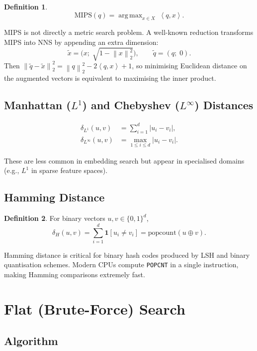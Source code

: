 \documentclass[11pt,a4paper]{article}
\theoremstyle{definition}
\newtheorem{definition}{Definition}[section]
\newcommand{\norm}[1]{\left\lVert #1 \right\rVert}
\newcommand{\inner}[2]{\left\langle #1, #2 \right\rangle}
\newcommand{\argmax}{\operatorname{arg\,max}}
\begin{document}
\begin{definition}
\[
  \mathrm{MIPS}(q) = \argmax_{x \in X}\; \inner{q}{x}.
\]
\end{definition}

MIPS is not directly a metric search problem.  A well-known reduction
transforms MIPS into NNS by appending an extra dimension:
\[
  \tilde{x} = \bigl(x;\; \sqrt{1 - \norm{x}^2_2}\bigr), \qquad
  \tilde{q} = (q;\; 0).
\]
Then $\norm{\tilde{q} - \tilde{x}}^2_2 = \norm{q}^2_2 - 2\inner{q}{x}
+ 1$, so minimising Euclidean distance on the augmented vectors is
equivalent to maximising the inner product.

\subsection{Manhattan ($L^1$) and Chebyshev ($L^\infty$) Distances}

\begin{align}
  \delta_{L^1}(u,v) &= \sum_{i=1}^d |u_i - v_i|, \\
  \delta_{L^\infty}(u,v) &= \max_{1\le i\le d} |u_i - v_i|.
\end{align}

These are less common in embedding search but appear in specialised
domains (e.g., $L^1$ in sparse feature spaces).

\subsection{Hamming Distance}

\begin{definition}
For binary vectors $u, v \in \{0,1\}^d$,
\[
  \delta_H(u,v) = \sum_{i=1}^{d} \mathbf{1}[u_i \neq v_i]
  = \mathrm{popcount}(u \oplus v).
\]
\end{definition}

Hamming distance is critical for binary hash codes produced by LSH and
binary quantisation schemes.  Modern CPUs compute \texttt{POPCNT} in a
single instruction, making Hamming comparisons extremely fast.


\section{Flat (Brute-Force) Search}\label{sec:flat}

\subsection{Algorithm}
\end{document}
